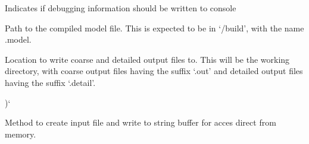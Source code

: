 \documentclass[letterpaper,10pt,english]{sphinxmanual}
\begin{document}
\begin{fulllineitems}
\begin{fulllineitems}
\label{\detokenize{bcmdModel:bayescmd.bcmdModel.bcmd_model.ModelBCMD.debug}}
 \textendash{} Indicates if debugging information should be written to console

\end{fulllineitems}


\begin{fulllineitems}
\label{\detokenize{bcmdModel:bayescmd.bcmdModel.bcmd_model.ModelBCMD.program}}
 \textendash{} Path to the compiled model file. This is expected to be in
‘{\hyperref[\detokenize{bcmdModel:bayescmd.bcmdModel.bcmd_model.ModelBCMD.basedir}]{}}/build’, with the name {\hyperref[\detokenize{bcmdModel:bayescmd.bcmdModel.bcmd_model.ModelBCMD.model_name}]{}}.model.

\end{fulllineitems}



\begin{fulllineitems}
 \textendash{} Location to write coarse and detailed output files to. This will be
the working directory, with coarse output files having the suffix
‘.out’ and detailed output files having the suffix ‘.detail’.

\end{fulllineitems}


\begin{fulllineitems}
\label{\detokenize{bcmdModel:bayescmd.bcmdModel.bcmd_model.ModelBCMD.output_dict}}
){}`

\end{fulllineitems}


\begin{fulllineitems}
\label{\detokenize{bcmdModel:bayescmd.bcmdModel.ModelBCMD.create_default_input}}
Method to create input file and write to string buffer for acces
direct from memory.


\end{fulllineitems}
\end{fulllineitems}
\end{document}
